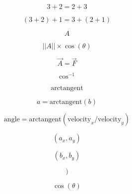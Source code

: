 \documentclass[12pt, a4paper]{article}
\begin{document}
\begin{equation}
\label{3plus2}
3 + 2 = 2 + 3
\end{equation}

\begin{equation}
\label{3plus2plus1}
(3 + 2) + 1 = 3 + (2 + 1)
\end{equation}

\begin{equation}
\label{A}
A
\end{equation}

\begin{equation}
\label{acostheta}
||A|| \times \cos (\theta)
\end{equation}

\begin{equation}
\label{aequalsf}
\vec{A} = \vec{F}
\end{equation}

\begin{equation}
\label{arccos}
\cos^{-1}
\end{equation}

\begin{equation}
\label{arctangent}
\textrm{arctangent}
\end{equation}

\begin{equation}
\label{arctangentab}
a = \textrm{arctangent}(b)
\end{equation}

\begin{equation}
\label{arctangentvelocity}
\textrm{angle} = \textrm{arctangent}(\textrm{velocity}_x/\textrm{velocity}_y)
\end{equation}

\begin{equation}
\label{axay}
(a_x, a_y)
\end{equation}

\begin{equation}
\label{bxby}
(b_x, b_y)
\end{equation}

\begin{equation}
\label{close}
)
\end{equation}

\begin{equation}
\label{costheta}
\cos(\theta)
\end{equation}
\end{document}
